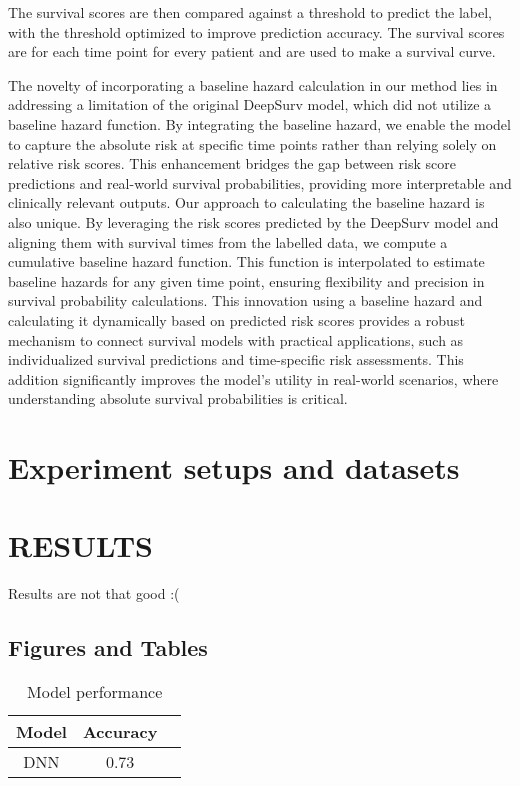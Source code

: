 \documentclass[conference]{ieeeconf}
\begin{document}
The survival scores are then compared against a threshold to predict the label, with the threshold optimized to improve prediction accuracy. The survival scores are for each time point for every patient and are used to make a survival curve. 

The novelty of incorporating a baseline hazard calculation in our method lies in addressing a limitation of the original DeepSurv model, which did not utilize a baseline hazard function. By integrating the baseline hazard, we enable the model to capture the absolute risk at specific time points rather than relying solely on relative risk scores. This enhancement bridges the gap between risk score predictions and real-world survival probabilities, providing more interpretable and clinically relevant outputs. 
Our approach to calculating the baseline hazard is also unique. By leveraging the risk scores predicted by the DeepSurv model and aligning them with survival times from the labelled data, we compute a cumulative baseline hazard function. This function is interpolated to estimate baseline hazards for any given time point, ensuring flexibility and precision in survival probability calculations. 
This innovation using a baseline hazard and calculating it dynamically based on predicted risk scores provides a robust mechanism to connect survival models with practical applications, such as individualized survival predictions and time-specific risk assessments. This addition significantly improves the model's utility in real-world scenarios, where understanding absolute survival probabilities is critical.

\section{Experiment setups and datasets}


\section{RESULTS}

Results are not that good :(

\subsection{Figures and Tables}

\begin{table}[h]
\caption{Model performance}
\label{table_example}
\begin{center}
\begin{tabular}{|c|c|c|}
\hline
Model & Accuracy\\
\hline
DNN & 0.73\\
\hline
\end{tabular}
\end{center}
\end{table}
\end{document}
